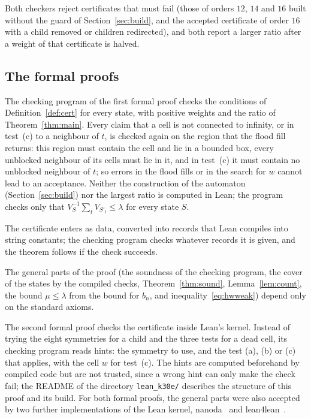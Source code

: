 \documentclass[11pt]{amsart}
\theoremstyle{definition}
\theoremstyle{remark}
\numberwithin{equation}{section}
\newcommand{\KDir}{lean\_k30e}
\begin{document}
Both checkers reject certificates that must fail (those of orders $12$, $14$ and $16$ built without the guard of Section~\ref{sec:build}, and the accepted certificate of order $16$ with a child removed or children redirected), and both report a larger ratio after a weight of that certificate is halved.

\subsection{The formal proofs}
The checking program of the first formal proof checks the conditions of Definition~\ref{def:cert} for every state, with positive weights and the ratio of Theorem~\ref{thm:main}. Every claim that a cell is not connected to infinity, or in test~(c) to a neighbour of $t$, is checked again on the region that the flood fill returns: this region must contain the cell and lie in a bounded box, every unblocked neighbour of its cells must lie in it, and in test~(c) it must contain no unblocked neighbour of $t$; so errors in the flood fills or in the search for $w$ cannot lead to an acceptance. Neither the construction of the automaton (Section~\ref{sec:build}) nor the largest ratio is computed in Lean; the program checks only that $V_S^{-1}\sum_tV_{S'_t}\le\lambda$ for every state $S$.

The certificate enters as data, converted into records that Lean compiles into string constants; the checking program checks whatever records it is given, and the theorem follows if the check succeeds.

The general parts of the proof (the soundness of the checking program, the cover of the states by the compiled checks, Theorem~\ref{thm:sound}, Lemma~\ref{lem:count}, the bound $\mu\le\lambda$ from the bound for $b_n$, and inequality~\eqref{eq:hwweak}) depend only on the standard axioms.

The second formal proof checks the certificate inside Lean's kernel. Instead of trying the eight symmetries for a child and the three tests for a dead cell, its checking program reads hints: the symmetry to use, and the test (a), (b) or (c) that applies, with the cell $w$ for test~(c). The hints are computed beforehand by compiled code but are not trusted, since a wrong hint can only make the check fail; the README of the directory \texttt{\KDir/} describes the structure of this proof and its build. For both formal proofs, the general parts were also accepted by two further implementations of the Lean kernel, nanoda~\cite{nanoda} and lean4lean~\cite{Car24}.
\end{document}
